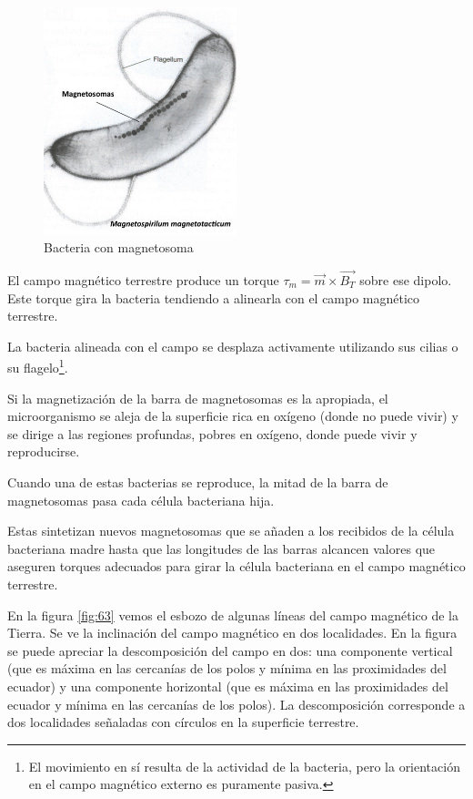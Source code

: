 \begin{figure}[H]
    \centering
    \includegraphics[width=0.5\textwidth]{./Figures/magnetosoma01}
	\caption{Bacteria con magnetosoma}
	\label{fig:magnetosoma01}
\end{figure}

El campo magnético terrestre produce un torque $\tau_{m}=\overrightarrow{m} \times \overrightarrow{B_{T}}$ sobre ese dipolo. 
Este torque gira la bacteria tendiendo a alinearla con el campo magnético terrestre.

La bacteria alineada con el campo se desplaza activamente utilizando sus cilias o su flagelo\footnote{El movimiento en sí resulta de la actividad de la bacteria, pero la orientación en el campo magnético externo es puramente pasiva.}. 

Si la magnetización de la barra de magnetosomas es la apropiada, el microorganismo se aleja de la superficie rica en oxígeno (donde no puede vivir) y se dirige a las regiones profundas, pobres en oxígeno, donde puede vivir y reproducirse.

Cuando una de estas bacterias se reproduce, la mitad de la barra de magnetosomas pasa cada célula bacteriana hija.

Estas sintetizan nuevos magnetosomas que se añaden a los recibidos de la célula bacteriana madre hasta que las longitudes de las barras alcancen valores que aseguren torques adecuados para girar la célula bacteriana en el campo magnético terrestre.


En la figura \ref{fig:63} vemos el esbozo de algunas líneas del campo magnético de la Tierra. Se ve la inclinación del campo magnético en dos localidades. En la figura se puede apreciar la descomposición del campo en dos: una componente vertical (que es máxima en las cercanías de los polos y mínima en las proximidades del ecuador) y una componente horizontal (que es máxima en las proximidades del ecuador y mínima en las cercanías de los polos). La descomposición corresponde a dos localidades señaladas con círculos en la superficie terrestre.

